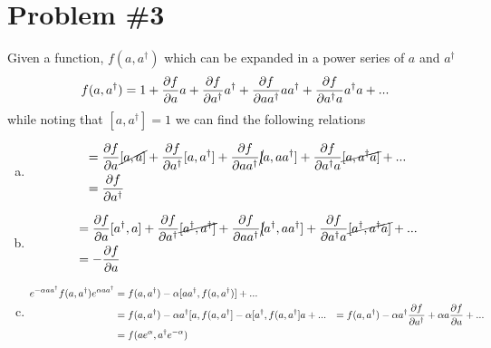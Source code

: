 \documentclass[11pt]{article}
\numberwithin{equation}{section}
\begin{document}
\section{Problem \#3}
Given a function, $f(a,a^{\dagger})$ which can be expanded in a power series of $a$ and $a^{\dagger}$
\begin{equation}
    f(a,a^{\dagger}) = 1 + \frac{\partial{f}}{\partial{a}}a + \frac{\partial{f}}{\partial{a^{\dagger}}}a^{\dagger} + \frac{\partial{f}}{\partial{aa^{\dagger}}}aa^{\dagger} + \frac{\partial{f}}{\partial{a^{\dagger}a}}a^{\dagger}a + ...
    \label{Prob3}
\end{equation}
while noting that $[a,a^{\dagger}] = 1$ we can find the following relations
\begin{enumerate}[(a)]
\item
    \begin{align*}
        [a,f(a,a^{\dagger})] &= \partiald{f}{a}\cancel{[a,a]} + \partiald{f}{a^{\dagger}}[a,a^{\dagger}] + \partiald{f}{aa^{\dagger}}\cancel[{a,aa^{\dagger}}] + \partiald{f}{a^{\dagger}a}\cancel{[a,a^{\dagger}a]} + ...\\
                             &= \partiald{f}{a^{\dagger}}
    \end{align*}

\item
    \begin{align*}
        [a^{\dagger},f(a,a^{\dagger})] &= \partiald{f}{a}[a^{\dagger},a] + \partiald{f}{a^{\dagger}}\cancel{[a^{\dagger},a^{\dagger}]} + \partiald{f}{aa^{\dagger}}\cancel[{a^{\dagger},aa^{\dagger}]} + \partiald{f}{a^{\dagger}a}\cancel{[a^{\dagger},a^{\dagger}a]} + ...\\
                             &= -\partiald{f}{a}
    \end{align*}

\item
    \begin{align*}
        e^{-\alpha{aa^{\dagger}}}f(a,a^{\dagger})e^{\alpha{aa^{\dagger}}} &= f(a,a^{\dagger}) - \alpha[aa^{\dagger},f(a,a^{\dagger})] + ...\\
                                                                          &= f(a,a^{\dagger}) - \alpha a^{\dagger}[a,f(a,a^{\dagger}] - \alpha [a^{\dagger},f(a,a^{\dagger}]a+...
                                                                          &= f(a,a^{\dagger}) - \alpha a^{\dagger}\frac{\partial{f}}{\partial{a^{\dagger}}} + \alpha a\frac{\partial{f}}{\partial{a}}+...\\
                                                                          &= f(ae^{\alpha},a^{\dagger}e^{-\alpha})
    \end{align*}
\end{enumerate}
\pagebreak
\end{document}
